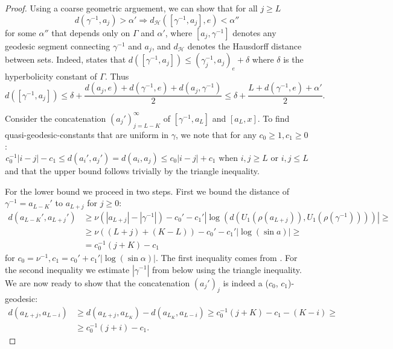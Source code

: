 \documentclass{report}
\begin{document}
\begin{proof}
    Using a coarse geometric arguement, we can show that for all $j \geq L$
    \[
        d(\gamma^{-1}, a_j) > \alpha' \Rightarrow
        d_{\mathcal H}([\gamma^{-1}, a_j], e) < \alpha''
    \]
    for some $\alpha''$ that depends only on $\Gamma$ and $\alpha'$, where $[a_j, \gamma^{-1}]$ denotes any geodesic segment connecting $\gamma^{-1}$ and $a_j$, and $d_\mathcal H$ denotes the Hausdorff distance between sets.
    Indeed, \cite[Lemme 2.17]{ghys2013groupes} states that 
    $d([\gamma^{-1}, a_j]) \leq (\gamma_j^{-1}, a_j)_e + \delta$
    where $\delta$ is the hyperbolicity constant of $\Gamma$.
    Thus
    \[
        d([\gamma^{-1}, a_j]) \leq \delta + \frac{d(a_j, e) + d(\gamma^{-1},e) + d(a_j, \gamma^{-1})}{2} \leq
        \delta + \frac{L + d(\gamma^{-1}, e) + \alpha'}{2}.
    \]

    Consider the concatenation $(a_j')_{j=L-K}^\infty$ of $[\gamma^{-1},a_L]$ and $[a_L, x]$.
    To find quasi-geodesic-constants that are uniform in $\gamma$, we note that for any $c_0 \geq 1, c_1 \geq 0$:
    \[
        c_0^{-1} |i - j| - c_1 \leq d(a_i', a_j') = d(a_i, a_j) \leq c_0 |i - j| + c_1 
        \text{ when } i,j \geq L \text{ or } i,j \leq L
    \]
    and that the upper bound follows trivially by the triangle inequality. 
    
    For the lower bound we proceed in two steps. 
    First we bound the distance of $\gamma^{-1} = a_{L-K}'$ to $a_{L+j}$ for $j\geq 0$:
    \begin{align*}
        d(a_{L-K}', a_{L+j}') 
        &\geq \nu (|a_{L+j}| - |\gamma^{-1}|) - c_0' -c_1'|\log(d(U_1(\rho(a_{L+j})), U_1(\rho(\gamma^{-1}))))| \geq\\
        &\geq \nu((L+j) + (K-L)) - c_0' -c_1'|\log(\sin a)| \geq\\
        &= c_0^{-1} (j+K) - c_1
    \end{align*}
    for $c_0 = \nu^{-1}, c_1 = c_0' + c_1'|\log(\sin \alpha)|$.
    The first inequality comes from \cite[Lemma 3.9]{pozzetti_anosov_2023}. For the second inequality we estimate $|\gamma^{-1}|$ from below using the triangle inequality.
    We are now ready to show that the concatenation $(a_j')_j$ is indeed a ($c_0$, $c_1$)-geodesic:
    \begin{align*}
        d(a_{L+j}, a_{L-i}) &\geq d(a_{L+j},a_{L_K}) - d(a_{L_K}, a_{L-i}) \geq
        c_0^{-1} (j+K) - c_1 - (K - i) \geq\\
        &\geq c_0^{-1} (j+i) - c_1.
    \end{align*}


\end{proof}
\end{document}
